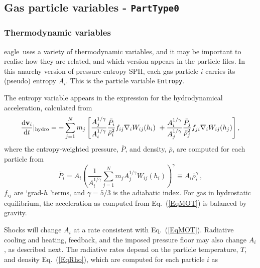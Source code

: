 \documentclass[10pt, a4paper]{article}
\newcommand{\eagle}{{\sc eagle}}
\begin{document}
\subsection{Gas particle variables - \texttt{PartType0}}
\subsubsection{Thermodynamic variables}
\label{SecThermo}
\eagle\ uses a variety of thermodynamic variables, and it may be important to
realise how they are related, and which version appears in the particle files.
In this {\sc anarchy} version of pressure-entropy SPH, each gas particle $i$
carries its (pseudo) entropy $A_i$. This is the particle variable
\texttt{Entropy}.

The entropy variable appears in the expression for the hydrodynamical
acceleration, calculated from \begin{equation} \frac{{\rm d}\mathbf{v}_i}{{\rm
d}t}|_{\rm hydro}=-\sum_{j=1}^N m_j  \left[
\frac{A_j^{1/\gamma}}{A_i^{1/\gamma}}\frac{\bar{P}_i}{\bar{\rho}_i^2}f_{ij}\nabla_i
W_{ij}(h_i) ~ +
\frac{A_i^{1/\gamma}}{A_j^{1/\gamma}}\frac{\bar{P}_j}{\bar{\rho}_j^2}f_{ji}\nabla_i
W_{ij}(h_j) \right] , \label{EqMOT} \end{equation} where the entropy-weighted
pressure, $\bar{P}$, and density, $\bar{\rho}$, are computed for each particle
from \begin{equation} \bar{P}_i = A_i
\left(\frac{1}{A_i^{1/\gamma}}\sum_{j=1}^N m_j A_j^{1/\gamma}
W_{ij}(h_i)\right)^{\gamma} \equiv A_i \bar{\rho}_i^{\gamma} \,, \label{EqpS}
\end{equation} $f_{ij}$ are \lq grad-$h$ \rq terms, and $\gamma=5/3$ is the adiabatic index. For
gas in hydrostatic equilibrium, the acceleration as computed from
Eq.~(\ref{EqMOT}) is balanced by gravity. 

Shocks will change $A_i$ at a rate consistent with Eq.~(\ref{EqMOT}).
Radiative cooling and heating, feedback, and the imposed pressure floor may
also change $A_i$, as described next.  The radiative rates depend on the
particle temperature, $T$, and density Eq.~(\ref{EqRho}), which are computed
for each particle $i$ as
\end{document}
